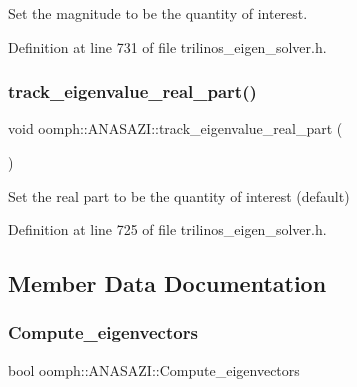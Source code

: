 Set the magnitude to be the quantity of interest. 



Definition at line 731 of file trilinos\+\_\+eigen\+\_\+solver.\+h.

\mbox{\label{classoomph_1_1ANASAZI_a8c2be3c7a1f810306b1c606ec2d8f90b}} 
\subsubsection{\texorpdfstring{track\+\_\+eigenvalue\+\_\+real\+\_\+part()}{track\_eigenvalue\_real\_part()}}
{\footnotesize\ttfamily void oomph\+::\+A\+N\+A\+S\+A\+Z\+I\+::track\+\_\+eigenvalue\+\_\+real\+\_\+part (\begin{DoxyParamCaption}{ }\end{DoxyParamCaption})\hspace{0.3cm}{\ttfamily [inline]}}



Set the real part to be the quantity of interest (default) 



Definition at line 725 of file trilinos\+\_\+eigen\+\_\+solver.\+h.



\subsection{Member Data Documentation}
\mbox{\label{classoomph_1_1ANASAZI_a4493c071c706cab869df34248f2dcdbf}} 
\subsubsection{\texorpdfstring{Compute\+\_\+eigenvectors}{Compute\_eigenvectors}}
{\footnotesize\ttfamily bool oomph\+::\+A\+N\+A\+S\+A\+Z\+I\+::\+Compute\+\_\+eigenvectors\hspace{0.3cm}{\ttfamily [private]}}



